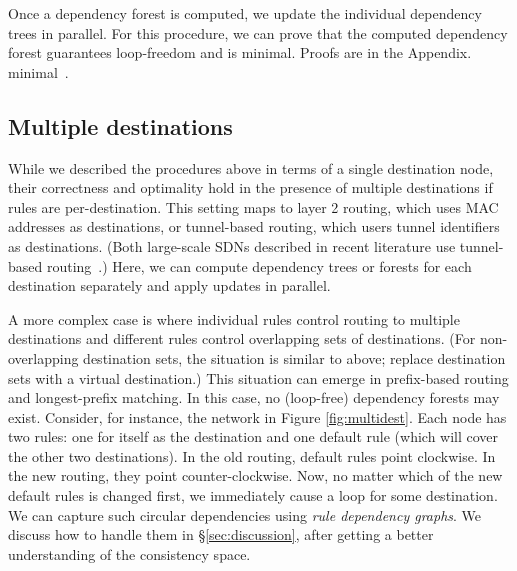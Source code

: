 
Once a dependency forest is computed, we update the individual dependency trees in parallel. For this procedure, we can prove that the computed dependency forest guarantees loop-freedom and is
\iflongversion
minimal. Proofs are in the Appendix.
\else
minimal~\cite{tr}.
\fi

\subsection{Multiple destinations}
\label{sec:multidest}

While we described the procedures above in terms of a single destination node, their correctness and optimality hold in the presence of multiple destinations if rules are per-destination. This setting maps to layer 2 routing, which uses MAC addresses as destinations, or tunnel-based routing, which users tunnel identifiers as destinations. (Both large-scale SDNs described in recent literature use tunnel-based routing~\cite{swan,b4}.) Here, we can compute dependency trees or forests for each destination separately and apply updates in parallel.


A more complex case is where individual rules control routing to multiple destinations and different rules control overlapping sets of destinations. (For non-overlapping destination sets, the situation is similar to above; replace destination sets with a virtual destination.) This situation can emerge in prefix-based routing and longest-prefix matching. In this case, no (loop-free) dependency forests may exist. Consider, for instance, the network in Figure \ref{fig:multidest}. Each node has two rules: one for itself as the destination and one default rule (which will cover the other two destinations).  In the old routing, default rules point clockwise. In the new routing, they point counter-clockwise. Now, no matter which of the new default rules is changed first, we immediately cause a loop for some destination. We can capture such circular dependencies using {\em rule dependency graphs}. We discuss how to handle them in \S\ref{sec:discussion}, after getting a better understanding of the consistency space.

